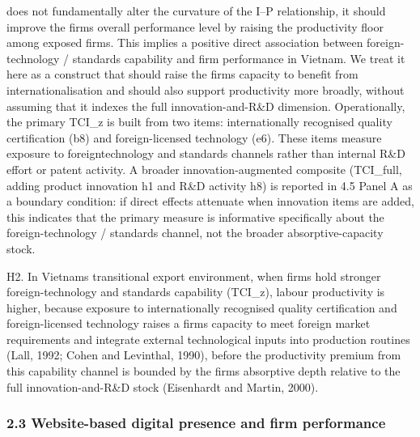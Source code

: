 \documentclass[12pt,a4paper]{article}
\begin{document}
does not fundamentally alter the curvature of the I--P relationship, it
should improve the firm\textquotesingle s overall performance level by
raising the productivity floor among exposed firms. This implies a
positive direct association between foreign-technology / standards
capability and firm performance in Vietnam. We treat it here as a
construct that should raise the firm\textquotesingle s capacity to
benefit from internationalisation and should also support productivity
more broadly, without assuming that it indexes the full
innovation-and-R\&D dimension. Operationally, the primary TCI\_z is
built from two items: internationally recognised quality certification
(b8) and foreign-licensed technology (e6). These items measure exposure
to foreigntechnology and standards channels rather than internal R\&D
effort or patent activity. A broader innovation-augmented composite
(TCI\_full, adding product innovation h1 and R\&D activity h8) is
reported in 4.5 Panel A as a boundary condition: if direct effects
attenuate when innovation items are added, this indicates that the
primary measure is informative specifically about the foreign-technology
/ standards channel, not the broader absorptive-capacity stock.

H2. In Vietnam\textquotesingle s transitional export environment, when
firms hold stronger foreign-technology and standards capability
(TCI\_z), labour productivity is higher, because exposure to
internationally recognised quality certification and foreign-licensed
technology raises a firm\textquotesingle s capacity to meet foreign
market requirements and integrate external technological inputs into
production routines (Lall, 1992; Cohen and Levinthal, 1990), before the
productivity premium from this capability channel is bounded by the
firm\textquotesingle s absorptive depth relative to the full
innovation-and-R\&D stock (Eisenhardt and Martin, 2000).

\hypertarget{23-website-based-digital-presence-and-firm-performance}{%
\subsubsection{2.3 Website-based digital presence and firm
performance}\label{23-website-based-digital-presence-and-firm-performance}}
\end{document}
